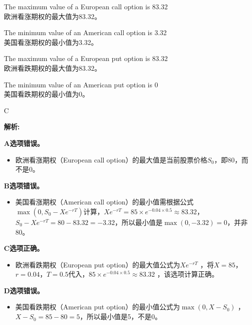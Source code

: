 \documentclass{article}
\newenvironment{explanation}
{\textbf{解析:}\par}
{\par}
\begin{document}
        \begin{choices}
            \item The maximum value of a European call option is 83.32\\
            欧洲看涨期权的最大值为83.32。
            \item The minimum value of an American call option is 3.32\\
            美国看涨期权的最小值为3.32。
            \item The maximum value of a European put option is 83.32\\
            欧洲看跌期权的最大值为83.32。
            \item The minimum value of an American put option is 0\\
            美国看跌期权的最小值为0。
        \end{choices}
        
        \begin{correctanswer}
        C
        \end{correctanswer}
        
        \begin{explanation}
        \textbf{A选项错误。}
        \begin{itemize}
        \item 欧洲看涨期权（European call option）的最大值是当前股票价格$S_0$，即80，而不是0。
        \end{itemize}
        \textbf{B选项错误。}
        \begin{itemize}
        \item 美国看涨期权（American call option）的最小值需根据公式$\max(0, S_0 - Xe^{-rT})$计算，$Xe^{-rT}=85\times e^{-0.04\times0.5}\approx83.32$，$S_0 - Xe^{-rT}=80 - 83.32=-3.32$，所以最小值是$\max(0, - 3.32)=0$，并非80。
        \end{itemize}
        \textbf{C选项正确。}
        \begin{itemize}
        \item 欧洲看跌期权（European put option）的最大值公式为$Xe^{-rT}$ ，将$X = 85$，$r = 0.04$，$T = 0.5$代入，$85\times e^{-0.04\times0.5}\approx83.32$ ，该选项计算正确。
        \end{itemize}
        \textbf{D选项错误。}
        \begin{itemize}
        \item 美国看跌期权（American put option）的最小值公式为$\max(0, X - S_0)$ ，$X - S_0 = 85 - 80 = 5$，所以最小值是5，不是0。
        \end{itemize}
        \end{explanation}
        
\end{document}
